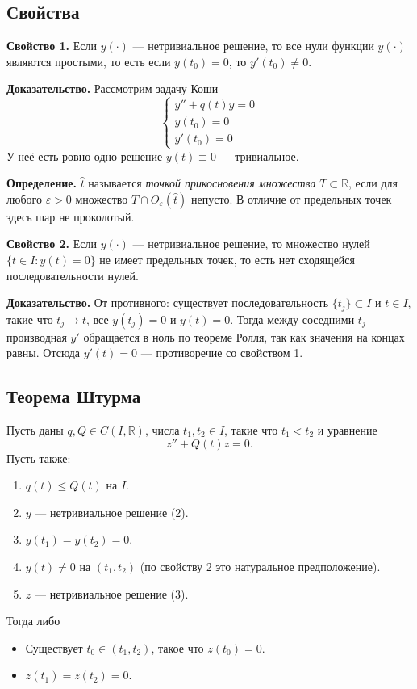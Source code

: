 \subsection{Свойства}
\textbf{Свойство 1.} Если $y(\cdot)$ --- нетривиальное решение, то все нули функции $y(\cdot)$ являются простыми, то есть если $y(t_0) = 0$, то $y'(t_0) \ne 0$.

\textbf{Доказательство.} Рассмотрим задачу Коши
\[
    \begin{cases}
        y'' + q(t) y = 0 \\
        y(t_0) = 0 \\
        y'(t_0) = 0
    \end{cases}
\]
У неё есть ровно одно решение $y(t) \equiv 0$ --- тривиальное.

\QED

\textbf{Определение.} $\widehat t$ называется \textit{точкой прикосновения множества} $T \subset \mathbb R$, если для любого $\varepsilon > 0$ множество $T \cap O_\varepsilon(\widehat t)$ непусто.
В отличие от предельных точек здесь шар не проколотый.

\textbf{Свойство 2.} Если $y(\cdot)$ --- нетривиальное решение, то множество нулей $\{t \in I: y(t) = 0\}$ не имеет предельных точек, то есть нет сходящейся последовательности нулей.

\textbf{Доказательство.} От противного: существует последовательность $\{t_j\} \subset I$ и $t \in I$, такие что $t_j \to t$, все $y(t_j) = 0$ и $y(t) = 0$.
Тогда между соседними $t_j$ производная $y'$ обращается в ноль по теореме Ролля, так как значения на концах равны.
Отсюда $y'(t) = 0$ --- противоречие со свойством 1.

\QED

\subsection{Теорема Штурма}
Пусть даны $q, Q \in C(I, \mathbb R)$, числа $t_1, t_2 \in I$, такие что $t_1 < t_2$ и уравнение
\begin{equation}
    z'' + Q(t) z = 0.
\end{equation}
Пусть также:
\begin{enumerate}
    \item $q(t) \le Q(t)$ на $I$.
    \item $y$ --- нетривиальное решение (2).
    \item $y(t_1) = y(t_2) = 0$.
    \item $y(t) \ne 0$ на $(t_1, t_2)$ (по свойству 2 это натуральное предположение).
    \item $z$ --- нетривиальное решение (3).
\end{enumerate}
Тогда либо
\begin{itemize}
    \item Существует $t_0 \in (t_1, t_2)$, такое что $z(t_0) = 0$.
    \item $z(t_1) = z(t_2) = 0$.
\end{itemize}

